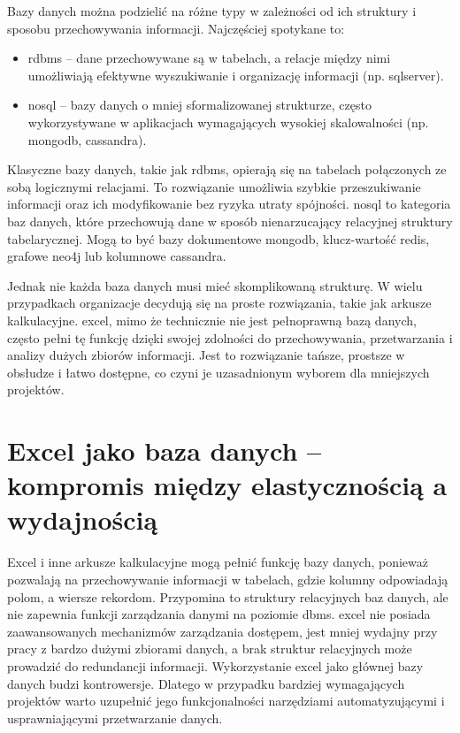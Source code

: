 Bazy danych można podzielić na różne typy w zależności od ich struktury i sposobu przechowywania informacji. Najczęściej spotykane to:
\begin{itemize}
    \item \gls{rdbms} – dane przechowywane są w tabelach, a relacje między nimi umożliwiają efektywne wyszukiwanie i organizację informacji (np. \gls{sqlserver}).
    \item \gls{nosql} – bazy danych o mniej sformalizowanej strukturze, często wykorzystywane w aplikacjach wymagających wysokiej skalowalności (np. \gls{mongodb}, \gls{cassandra}).
\end{itemize}
Klasyczne bazy danych, takie jak \gls{rdbms}, opierają się na tabelach połączonych ze sobą logicznymi relacjami. To rozwiązanie umożliwia szybkie przeszukiwanie informacji oraz ich modyfikowanie bez ryzyka utraty spójności. 
\gls{nosql} to kategoria baz danych, które przechowują dane w sposób nienarzucający relacyjnej struktury tabelarycznej. Mogą to być bazy dokumentowe \gls{mongodb}, klucz-wartość \gls{redis}, grafowe \gls{neo4j} lub kolumnowe \gls{cassandra}. 

Jednak nie każda baza danych musi mieć skomplikowaną strukturę. W wielu przypadkach organizacje decydują się na proste rozwiązania, takie jak arkusze kalkulacyjne. \gls{excel}, mimo że technicznie nie jest pełnoprawną bazą danych, często pełni tę funkcję dzięki swojej zdolności do przechowywania, przetwarzania i analizy dużych zbiorów informacji. Jest to rozwiązanie tańsze, prostsze w obsłudze i łatwo dostępne, co czyni je uzasadnionym wyborem dla mniejszych projektów.

\section{Excel jako baza danych – kompromis między elastycznością a wydajnością}

Excel i inne arkusze kalkulacyjne mogą pełnić funkcję bazy danych, ponieważ pozwalają na przechowywanie informacji w tabelach, gdzie kolumny odpowiadają polom, a wiersze rekordom. Przypomina to struktury relacyjnych baz danych, ale nie zapewnia funkcji zarządzania danymi na poziomie \gls{dbms}. \gls{excel} nie posiada zaawansowanych mechanizmów zarządzania dostępem, jest mniej wydajny przy pracy z bardzo dużymi zbiorami danych, a brak struktur relacyjnych może prowadzić do redundancji informacji. Wykorzystanie \gls{excel} jako głównej bazy danych budzi kontrowersje. Dlatego w przypadku bardziej wymagających projektów warto uzupełnić jego funkcjonalności narzędziami automatyzującymi i usprawniającymi przetwarzanie danych.

